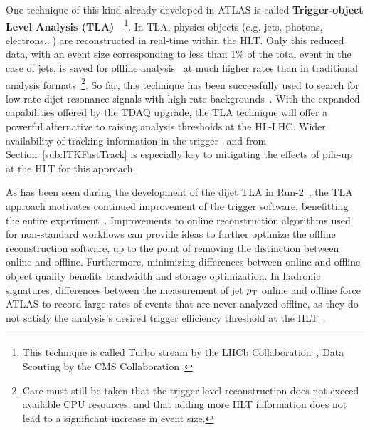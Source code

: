 One technique of this kind already developed in ATLAS is called \textbf{Trigger-object Level Analysis (TLA)}~\cite{EXOT-2016-20}~\footnote{This technique is called Turbo stream by the LHCb Collaboration~\cite{Aaij:2016rxn}, Data Scouting by the CMS Collaboration~\cite{Khachatryan:2016ecr}}. 
In TLA, physics objects (e.g. jets, photons, electrons...) are reconstructed in real-time within the HLT. Only this reduced data, with an event size corresponding to less than 1\% of the total event in the case of jets, is saved for offline analysis~\cite{EXOT-2016-20,ATL-DAQ-PUB-2017-003} at much higher rates than in traditional analysis formats~\footnote{Care must still be taken that the trigger-level reconstruction does not exceed available CPU resources, and that adding more HLT information does not lead to a significant increase in event size.}. 
So far, this technique has been successfully used to search for low-rate dijet resonance signals with high-rate backgrounds~\cite{EXOT-2016-20}. 
With the expanded capabilities offered by the TDAQ upgrade, the TLA technique will offer a powerful alternative to raising analysis thresholds at the HL-LHC. 
Wider availability of tracking information in the trigger~\cite{ATLAS-TDR-29} and from Section~\ref{sub:ITKFastTrack} is especially key to mitigating the effects of pile-up at the HLT for this approach.

As has been seen during the development of the dijet TLA in Run-2~\cite{Jet_Trigger_Paper_In_Preparation}, the TLA approach motivates continued improvement of the trigger software, benefitting the entire experiment~\cite{ATL-DAQ-PUB-2017-003}.
Improvements to online reconstruction algorithms used for non-standard workflows can provide ideas to further optimize the offline reconstruction software, up to the point of removing the distinction between online and offline.
Furthermore, minimizing differences between online and offline object quality benefits bandwidth and storage optimization. In hadronic signatures, differences between the measurement of jet $p_{\rm{T}}$ online and offline force ATLAS to record large rates of events that are never analyzed offline, as they do not satisfy the analysis's desired trigger efficiency threshold at the HLT~\cite{Jet_Trigger_Paper_In_Preparation}.

